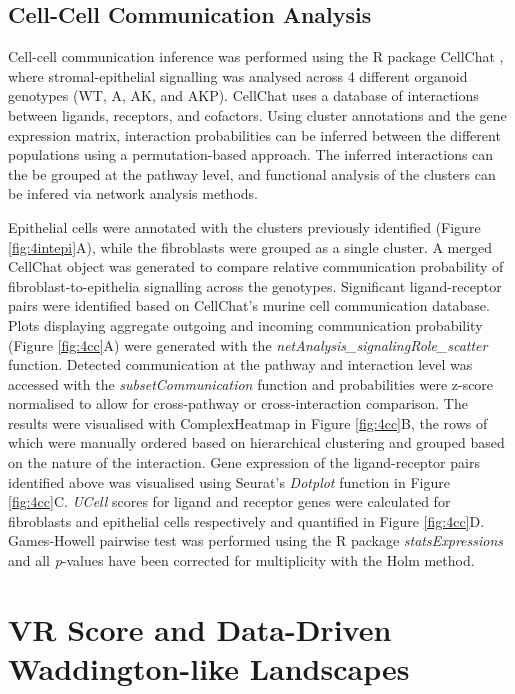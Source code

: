 \subsection{Cell-Cell Communication Analysis}

Cell-cell communication inference was performed using the R package CellChat \cite{jin_inference_2021}, where stromal-epithelial signalling was analysed across 4 different organoid genotypes (WT, A, AK, and AKP). CellChat uses a database of interactions between ligands, receptors, and cofactors. 
Using cluster annotations and the gene expression matrix, interaction probabilities can be inferred between the different populations using a permutation-based approach. The inferred interactions can the be grouped at the pathway level, and functional analysis of the clusters can be infered via network analysis methods. 

Epithelial cells were annotated with the clusters previously identified (Figure \ref{fig:4intepi}A), while the fibroblasts were grouped as a single cluster. A merged CellChat object was generated to compare relative communication probability of fibroblast-to-epithelia signalling across the genotypes. Significant ligand-receptor pairs were identified based on CellChat's murine cell communication database. Plots displaying aggregate outgoing and incoming communication probability (Figure \ref{fig:4cc}A) were generated with the \textit{netAnalysis\_signalingRole\_scatter} function. Detected communication at the pathway and interaction level was accessed with the \textit{subsetCommunication} function and probabilities were z-score normalised to allow for cross-pathway or cross-interaction comparison. The results were visualised with ComplexHeatmap in Figure \ref{fig:4cc}B, the rows of which were manually ordered based on hierarchical clustering and grouped based on the nature of the interaction. Gene expression of the ligand-receptor pairs identified above was visualised using Seurat's \textit{Dotplot} function in Figure \ref{fig:4cc}C. \textit{UCell} scores for ligand and receptor genes were calculated for fibroblasts and epithelial cells respectively and quantified in Figure \ref{fig:4cc}D. Games-Howell pairwise test was performed using the R package \textit{statsExpressions} and all \textit{p}-values have been corrected for multiplicity with the Holm method.


\section{VR Score and Data-Driven Waddington-like Landscapes}


